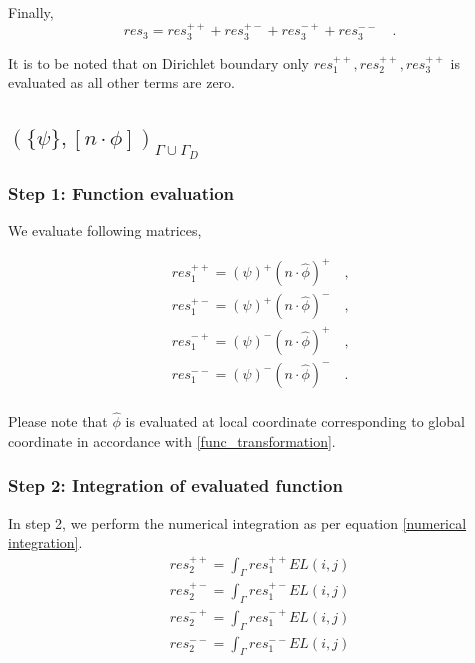 \documentclass[a4paper,openany]{book}
\begin{document}
Finally,
\begin{equation}
res_3 = res_3^{++} + res_3^{+-} + res_3^{-+} + res_3^{--} \quad \textrm{.}
\end{equation}

It is to be noted that on Dirichlet boundary only $res_1^{++}, res_2^{++}, res_3^{++}$ is evaluated as all other terms are zero.

\subsection{$(\lbrace \psi \rbrace, [n \cdot \phi])_{\Gamma \cup \Gamma_D}$}

\subsubsection{Step 1: Function evaluation}

We evaluate following matrices, 

\begin{equation}
\begin{split}
res_1^{++} = (\psi)^+ (n \cdot \hat{\phi})^+ \quad \textrm{,}\\
res_1^{+-} = (\psi)^+ (n \cdot \hat{\phi})^- \quad \textrm{,}\\
res_1^{-+} = (\psi)^- (n \cdot \hat{\phi})^+ \quad \textrm{,}\\
res_1^{--} = (\psi)^- (n \cdot \hat{\phi})^- \quad \textrm{.}\\
\end{split}
\end{equation}

Please note that $\hat{\phi}$ is evaluated at local coordinate corresponding to global coordinate in accordance with \eqref{func_transformation}.

\subsubsection{Step 2: Integration of evaluated function}

In step 2, we perform the numerical integration as per equation \eqref{numerical integration}.
\begin{equation}
\begin{split}
res_2^{++} = \int_{\Gamma} res_1^{++} EL(i,j)\\
res_2^{+-} = \int_{\Gamma} res_1^{+-} EL(i,j)\\
res_2^{-+} = \int_{\Gamma} res_1^{-+} EL(i,j)\\
res_2^{--} = \int_{\Gamma} res_1^{--} EL(i,j)\\
\end{split}
\end{equation}
\end{document}
